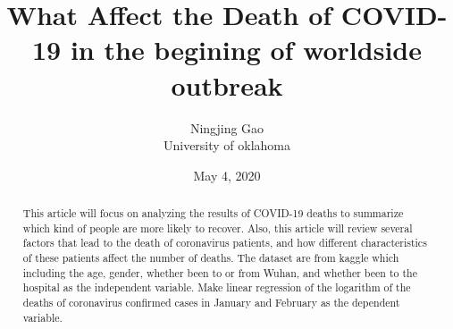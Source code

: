 \documentclass[12pt,english]{article}
\begin{document}
\begin{singlespace}
\title{What Affect the  Death of COVID-19 in the begining of worldside outbreak}
\end{singlespace}

\author{Ningjing Gao\\University of oklahoma}
\date{May 4, 2020}

\maketitle

\begin{abstract}
This article will focus on analyzing the results of COVID-19 deaths to summarize which kind of people are more likely to recover. Also, this article will review several factors that lead to the death of coronavirus patients, and how different characteristics of these patients affect the number of deaths. The dataset are from kaggle which including the age, gender, whether been to or from Wuhan, and whether been to the hospital as the independent variable. Make linear regression of the logarithm of the deaths of coronavirus confirmed cases in January and February as the dependent variable.


\end{abstract}
\pagebreak{}
\end{document}
